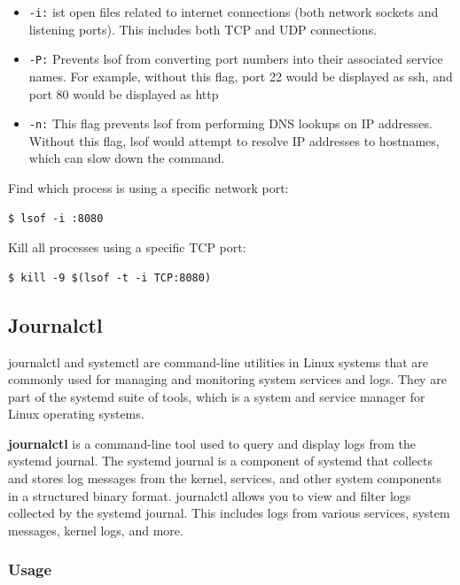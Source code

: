 \documentclass{article}
\newenvironment{codetemplate}[1][]{%
  \mybasecolorbox[#1]
  \itshape
}{%
  \endmybasecolorbox
}
\begin{document}
\begin{itemize}
    \item \verb|-i:| ist open files related to internet connections (both network sockets and listening ports). This includes both TCP and UDP connections.
    \item \verb|-P:| Prevents lsof from converting port numbers into their associated service names. For example, without this flag, port 22 would be displayed as ssh, and port 80 would be displayed as http
    \item \verb|-n:| This flag prevents lsof from performing DNS lookups on IP addresses. Without this flag, lsof would attempt to resolve IP addresses to hostnames, which can slow down the command.
\end{itemize}

Find which process is using a specific network port:
\begin{codetemplate}{}
\begin{verbatim}
$ lsof -i :8080
\end{verbatim}
\end{codetemplate}

Kill all processes using a specific TCP port:
\begin{codetemplate}{}
\begin{verbatim}
$ kill -9 $(lsof -t -i TCP:8080)
\end{verbatim}
\end{codetemplate}

\subsection{Journalctl}
journalctl and systemctl are command-line utilities in Linux systems that are commonly used for managing and monitoring system services and logs. They are part of the systemd suite of tools, which is a system and service manager for Linux operating systems.

\textbf{journalctl} is a command-line tool used to query and display logs from the systemd journal. The systemd journal is a component of systemd that collects and stores log messages from the kernel, services, and other system components in a structured binary format.
journalctl allows you to view and filter logs collected by the systemd journal. This includes logs from various services, system messages, kernel logs, and more.

\subsubsection{Usage}
\end{document}
